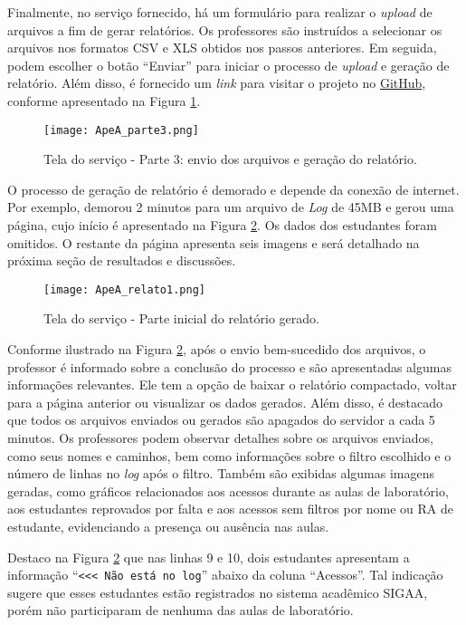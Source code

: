 Finalmente, no serviço fornecido, há um formulário para realizar o \textit{upload} de arquivos a fim de gerar relatórios. Os professores são instruídos a selecionar os arquivos nos formatos CSV e XLS obtidos nos passos anteriores. Em seguida, podem escolher o botão ``Enviar'' para iniciar o processo de \textit{upload} e geração de relatório. Além disso, é fornecido um \textit{link} para visitar o projeto no \href{https://github.com/fzampirolli/LabMoodle}{GitHub}, conforme apresentado na Figura \ref{fig:ApeA_parte3}.

\begin{figure}[!ht]
\centering
\texttt{[image: ApeA\_parte3.png]}
    \caption{Tela do serviço - Parte 3: envio dos arquivos e geração do relatório.}
\label{fig:ApeA_parte3}
\end{figure}

O processo de geração de relatório é demorado e depende da conexão de internet. Por exemplo, demorou 2 minutos para um arquivo de \textit{Log} de 45MB e gerou uma página, cujo início é apresentado na Figura \ref{fig:ApeA_relato1}. Os dados dos estudantes foram omitidos. O restante da página apresenta seis imagens e será detalhado na próxima seção de resultados e discussões.

\begin{figure}[!ht]
\centering
\texttt{[image: ApeA\_relato1.png]}
    \caption{Tela do serviço - Parte inicial do relatório gerado.}
\label{fig:ApeA_relato1}
\end{figure}

Conforme ilustrado na Figura \ref{fig:ApeA_relato1}, após o envio bem-sucedido dos arquivos, o professor é informado sobre a conclusão do processo e são apresentadas algumas informações relevantes. Ele tem a opção de baixar o relatório compactado, voltar para a página anterior ou visualizar os dados gerados. Além disso, é destacado que todos os arquivos enviados ou gerados são apagados do servidor a cada 5 minutos. Os professores podem observar detalhes sobre os arquivos enviados, como seus nomes e caminhos, bem como informações sobre o filtro escolhido e o número de linhas no \textit{log} após o filtro. Também são exibidas algumas imagens geradas, como gráficos relacionados aos acessos durante as aulas de laboratório, aos estudantes reprovados por falta e aos acessos sem filtros por nome ou RA de estudante, evidenciando a presença ou ausência nas aulas. 

Destaco na Figura \ref{fig:ApeA_relato1} que nas linhas 9 e 10, dois estudantes apresentam a informação ``\verb|<<< Não está no log|'' abaixo da coluna ``Acessos''. Tal indicação sugere que esses estudantes estão registrados no sistema acadêmico SIGAA, porém não participaram de nenhuma das aulas de laboratório.

